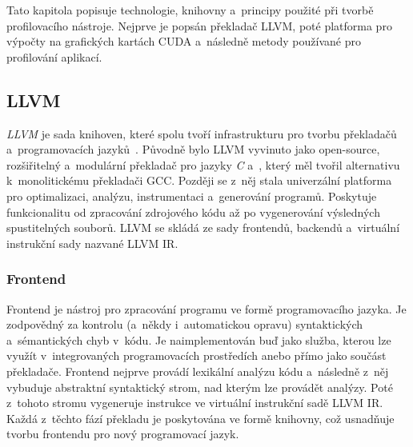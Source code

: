 Tato kapitola popisuje technologie, knihovny a~principy použité při tvorbě profilovacího nástroje. Nejprve je popsán překladač LLVM, poté platforma pro výpočty na grafických kartách CUDA a~následně metody používané pro profilování aplikací.

\subsection{LLVM}
\emph{LLVM} je sada knihoven, které spolu tvoří infrastrukturu pro tvorbu překladačů a~programovacích jazyků~\cite{llvm}. Původně bylo LLVM vyvinuto jako open-source, rozšiřitelný a~modulární překladač pro jazyky \emph{C} a~\emph{\CPP}, který měl tvořil alternativu k~monolitickému překladači GCC. Později se z~něj stala univerzální platforma pro optimalizaci, analýzu, instrumentaci a~generování programů. Poskytuje funkcionalitu od zpracování zdrojového kódu až po vygenerování výsledných spustitelných souborů. LLVM se skládá ze sady frontendů, backendů a~virtuální instrukční sady nazvané LLVM IR.
\subsubsection*{Frontend}
Frontend je nástroj pro zpracování programu ve formě programovacího jazyka. Je zodpovědný za kontrolu (a~někdy i~automatickou opravu) syntaktických a~sémantických chyb v~kódu. Je naimplementován buď jako služba, kterou lze využít v~integrovaných programovacích prostředích anebo přímo jako součást překladače. Frontend nejprve provádí lexikální analýzu kódu a~následně z~něj vybuduje abstraktní syntaktický strom, nad kterým lze provádět analýzy. Poté z~tohoto stromu vygeneruje instrukce ve virtuální instrukční sadě LLVM IR. Každá z~těchto fází překladu je poskytována ve formě knihovny, což usnadňuje tvorbu frontendu pro nový programovací jazyk.
